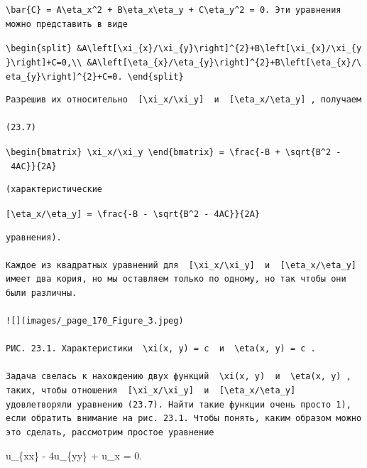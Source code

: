 \documentclass[
  ukrainian,
]{article}
\begin{document}
\begin{verbatim}
\bar{C} = A\eta_x^2 + B\eta_x\eta_y + C\eta_y^2 = 0. Эти уравнения можно представить в виде
\end{verbatim}

\texttt{\textbackslash{}begin\{split\}\ \&A\textbackslash{}left{[}\textbackslash{}xi\_\{x\}/\textbackslash{}xi\_\{y\}\textbackslash{}right{]}\^{}\{2\}+B\textbackslash{}left{[}\textbackslash{}xi\_\{x\}/\textbackslash{}xi\_\{y\}\textbackslash{}right{]}+C=0,\textbackslash{}\textbackslash{}\ \&A\textbackslash{}left{[}\textbackslash{}eta\_\{x\}/\textbackslash{}eta\_\{y\}\textbackslash{}right{]}\^{}\{2\}+B\textbackslash{}left{[}\textbackslash{}eta\_\{x\}/\textbackslash{}eta\_\{y\}\textbackslash{}right{]}\^{}\{2\}+C=0.\ \textbackslash{}end\{split\}}

\begin{verbatim}
Разрешив их относительно  [\xi_x/\xi_y]  и  [\eta_x/\eta_y] , получаем

(23.7)
\end{verbatim}

\texttt{\textbackslash{}begin\{bmatrix\}\ \textbackslash{}xi\_x/\textbackslash{}xi\_y\ \textbackslash{}end\{bmatrix\}\ =\ \textbackslash{}frac\{-B\ +\ \textbackslash{}sqrt\{B\^{}2\ -\ 4AC\}\}\{2A\}}

\begin{verbatim}
(характеристические
\end{verbatim}

\texttt{{[}\textbackslash{}eta\_x/\textbackslash{}eta\_y{]}\ =\ \textbackslash{}frac\{-B\ -\ \textbackslash{}sqrt\{B\^{}2\ -\ 4AC\}\}\{2A\}}

\begin{verbatim}
уравнения).

Kaждое из квадратных уравнений для  [\xi_x/\xi_y]  и  [\eta_x/\eta_y]  имеет два кория, но мы оставляем только по одному, но так чтобы они были различны.

![](images/_page_170_Figure_3.jpeg)

РИС. 23.1. Характеристики  \xi(x, y) = c  и  \eta(x, y) = c .

Задача свелась к нахождению двух функций  \xi(x, y)  и  \eta(x, y) , таких, чтобы отношения  [\xi_x/\xi_y]  и  [\eta_x/\eta_y]  удовлетворяли уравнению (23.7). Найти такие функции очень просто 1), если обратить внимание на рис. 23.1. Чтобы понять, каким образом можно это сделать, рассмотрим простое уравнение
\end{verbatim}

u\_\{xx\} - 4u\_\{yy\} + u\_x = 0.
\end{document}
